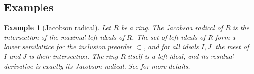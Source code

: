 \documentclass{article}
\newtheorem{example}[theorem]{Example}
\newtheorem{remark}[theorem]{Remark}
\begin{document}



\subsection{Examples\label{section.examples.frattini}}

\begin{example}[Jacobson radical]
    Let $R$ be a ring. The \textit{Jacobson radical} of $R$ is the intersection of the maximal left ideals of $R$. The set of left ideals of $R$ form a lower semilattice for the inclusion preorder $\subset$, and for all ideals $I,J$, the meet of $I$ and $J$ is their intersection.
    The ring $R$ itself is a left ideal, and its residual derivative is exactly its Jacobson radical. See \cite{Lam1991} for more details. 
\end{example}
\end{document}
